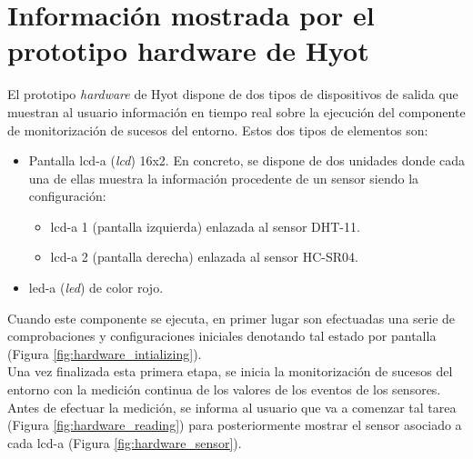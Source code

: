 \documentclass[12pt,a4paper, twoside]{report}
\begin{document}
	\chapter{Información mostrada por el prototipo hardware de Hyot}\label{hardware} 
	
	El \gls{prototipo} \textit{hardware} de Hyot dispone de dos tipos de dispositivos de salida que muestran al usuario información en tiempo real sobre la ejecución del componente de monitorización de sucesos del entorno. Estos dos tipos de elementos son:
	
	\begin{itemize}
		\item Pantalla \gls{lcd-a} (\textit{\gls{lcd}}) 16x2. En concreto, se dispone de dos unidades donde cada una de ellas muestra la información procedente de un sensor siendo la configuración:
		
		\begin{itemize}
			\item \gls{lcd-a} 1 (pantalla izquierda) enlazada al \gls{sensor} DHT-11.
			\item \gls{lcd-a} 2 (pantalla derecha) enlazada al \gls{sensor} HC-SR04.
		\end{itemize}
		
		\item \gls{led-a} (\textit{\gls{led}}) de color rojo. 
	\end{itemize}
	
	Cuando este componente se ejecuta, en primer lugar son efectuadas una serie de comprobaciones y configuraciones iniciales denotando tal estado por pantalla (Figura \ref{fig:hardware_intializing}). \\
	
	
	Una vez finalizada esta primera etapa, se inicia la monitorización de sucesos del entorno con la medición continua de los valores de los eventos de los sensores. Antes de efectuar la medición, se informa al usuario que va a comenzar tal tarea (Figura \ref{fig:hardware_reading}) para posteriormente mostrar el \gls{sensor} asociado a cada \gls{lcd-a} (Figura \ref{fig:hardware_sensor}).
	
\end{document}

